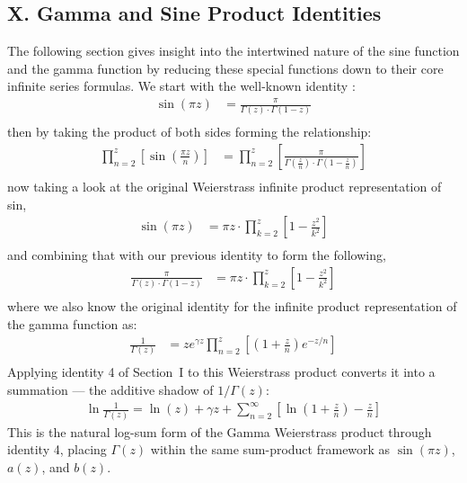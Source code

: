 \documentclass{article}
\begin{document}
\subsection{X. Gamma and Sine Product Identities}
The following section gives insight into the intertwined nature of the sine function and the gamma function by reducing these special functions down to their core infinite series formulas.
We start with the well-known identity \cite{chan2006sine}:
\begin{align*}
\sin(\pi z) &= \frac{\pi}{\Gamma\left(z\right) \cdot \Gamma\left(1 - z\right)} \\
\end{align*}
then by taking the product of both sides forming the relationship:
\begin{align*}
\prod_{n=2}^z\left[\sin\!\left(\frac{\pi z}{n}\right)\right] &= \prod_{n=2}^z\left[\frac{\pi}{\Gamma\!\left(\frac{z}{n}\right) \cdot \Gamma\!\left(1 - \frac{z}{n}\right)}\right] \\
\end{align*}
now taking a look at the original Weierstrass infinite product representation of sin,
\begin{align*}
\sin(\pi z) &= \pi z \cdot \prod_{k=2}^z\left[1 - \frac{z^2}{k^2}\right] \\
\end{align*}
and combining that with our previous identity to form the following,
\begin{align*}
\frac{\pi}{\Gamma\left(z\right) \cdot \Gamma\left(1 - z\right)} &= \pi z \cdot \prod_{k=2}^z\left[1 - \frac{z^2}{k^2}\right] \\
\end{align*}
where we also know the original identity for the infinite product representation of the gamma function as:
\begin{align*}
\frac{1}{\Gamma\left(z\right)} &= ze^{\gamma z} \prod_{n=2}^z\left[\left(1 + \frac{z}{n}\right)e^{-z/n}\right] \\
\end{align*}
Applying identity 4 of Section~I to this Weierstrass product converts it into a summation --- the additive shadow of $1/\Gamma(z)$:
\begin{align*}
\ln\frac{1}{\Gamma(z)} = \ln(z) + \gamma z + \sum_{n=2}^{\infty}\left[\ln\!\left(1 + \frac{z}{n}\right) - \frac{z}{n}\right]
\end{align*}
This is the natural log-sum form of the Gamma Weierstrass product through identity 4, placing $\Gamma(z)$ within the same sum-product framework as $\sin(\pi z)$, $a(z)$, and $b(z)$.
\end{document}
